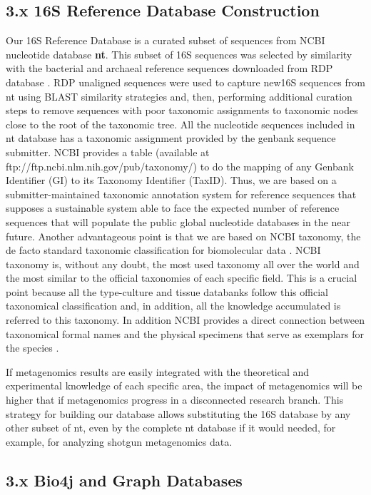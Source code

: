 \documentclass{frontiersSCNS} %
\begin{document}
\subsection{3.x 16S Reference Database
Construction}\label{x-16s-reference-database-construction}

Our 16S Reference Database is a curated subset of sequences from NCBI
nucleotide database \textbf{nt}. This subset of 16S sequences was
selected by similarity with the bacterial and archaeal reference
sequences downloaded from RDP database \citep{Cole-2014}. RDP unaligned
sequences were used to capture new16S sequences from nt using BLAST
similarity strategies and, then, performing additional curation steps to
remove sequences with poor taxonomic assignments to taxonomic nodes
close to the root of the taxonomic tree. All the nucleotide sequences
included in nt database has a taxonomic assignment provided by the
genbank sequence submitter. NCBI provides a table (available at
ftp://ftp.ncbi.nlm.nih.gov/pub/taxonomy/) to do the mapping of any
Genbank Identifier (GI) to its Taxonomy Identifier (TaxID). Thus, we are
based on a submitter-maintained taxonomic annotation system for
reference sequences that supposes a sustainable system able to face the
expected number of reference sequences that will populate the public
global nucleotide databases in the near future. Another advantageous
point is that we are based on NCBI taxonomy, the de facto standard
taxonomic classification for biomolecular data \citep{Cochrane-2010}.
NCBI taxonomy is, without any doubt, the most used taxonomy all over the
world and the most similar to the official taxonomies of each specific
field. This is a crucial point because all the type-culture and tissue
databanks follow this official taxonomical classification and, in
addition, all the knowledge accumulated is referred to this taxonomy. In
addition NCBI provides a direct connection between taxonomical formal
names and the physical specimens that serve as exemplars for the species
\citep{Federhen-2015}.

If metagenomics results are easily integrated with the theoretical and
experimental knowledge of each specific area, the impact of metagenomics
will be higher that if metagenomics progress in a disconnected research
branch. This strategy for building our database allows substituting the
16S database by any other subset of nt, even by the complete nt database
if it would needed, for example, for analyzing shotgun metagenomics
data.

\subsection{3.x Bio4j and Graph
Databases}\label{x-bio4j-and-graph-databases}
\end{document}
